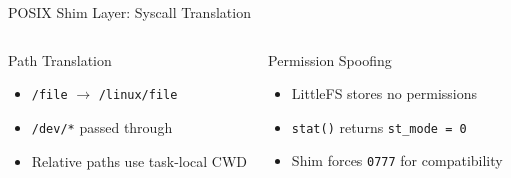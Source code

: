\documentclass[aspectratio=169, 10pt]{beamer}
\begin{document}
\begin{frame}{POSIX Shim Layer: Syscall Translation}
\begin{center}
{
        }
    \end{center}

    \vspace{0.3cm}
    \begin{columns}[T]
        \begin{block}{Path Translation}
            \begin{itemize}
                \item \texttt{/file} $\to$ \texttt{/linux/file}
                \item \texttt{/dev/*} passed through
                \item Relative paths use task-local CWD
            \end{itemize}
        \end{block}

        \begin{block}{Permission Spoofing}
            \begin{itemize}
                \item LittleFS stores no permissions
                \item \texttt{stat()} returns \texttt{st\_mode = 0}
                \item Shim forces \texttt{0777} for compatibility
            \end{itemize}
        \end{block}
    \end{columns}
\end{frame}
\end{document}
